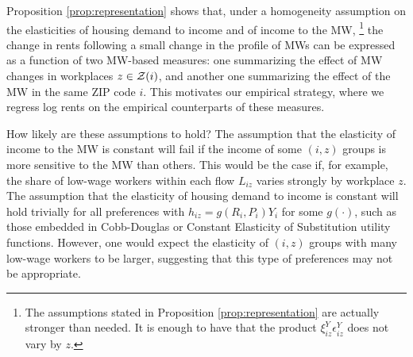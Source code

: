 Proposition \ref{prop:representation} shows that, under a homogeneity assumption
on the elasticities of housing demand to income and of income to the MW,%
\footnote{The assumptions stated in Proposition \ref{prop:representation} are 
actually stronger than needed.
It is enough to have that the product $\xi^Y_{iz} \epsilon_{iz}^Y$ does not vary 
by $z$.}
the change in rents following a small change in the profile of MWs can be 
expressed as a function of two MW-based measures:
one summarizing the effect of MW changes in workplaces $z\in\mathcal{Z}(i)$,
and another one summarizing the effect of the MW in the same ZIP code $i$.
This motivates our empirical strategy, where we regress log rents on the empirical
counterparts of these measures.

How likely are these assumptions to hold?
The assumption that the elasticity of income to the MW is constant will fail if 
the income of some $(i,z)$ groups is more sensitive to the MW than others.
This would be the case if, for example, the share of low-wage workers within 
each flow $L_{iz}$ varies strongly by workplace $z$.
The assumption that the elasticity of housing demand to income is constant 
will hold trivially for all preferences with
$h_{iz} = g\left(R_i, P_i\right) Y_i$ for some $g\left(\cdot\right)$, such as 
those embedded in Cobb-Douglas or Constant Elasticity of Substitution utility 
functions.
However, one would expect the elasticity of $(i,z)$ groups with many low-wage 
workers to be larger, suggesting that this type of preferences may not be 
appropriate.

